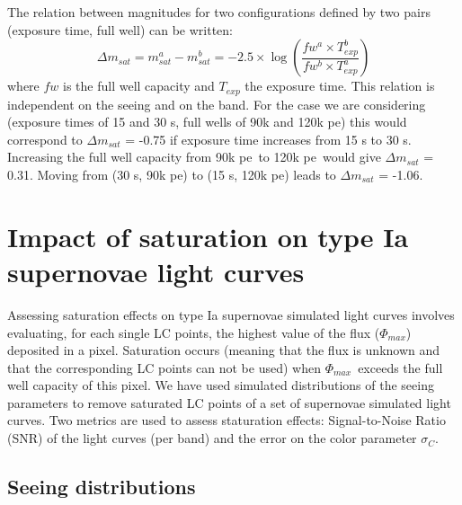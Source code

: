 \documentclass[\docopts]{\docclass}
\newcommand{\pe}{{pe}}
\newcommand{\phimax}{{$\Phi_{max}$}}
\newcommand{\colorerr}{{$\sigma_C$}}
\begin{document}
The relation between magnitudes for two configurations defined by two pairs (exposure time, full well) can be written:
\begin{equation}
\Delta m_{sat} = m^a_{sat}-m^b_{sat} = -2.5 \times \log\left(\frac{fw^a\times T_{exp}^b}{fw^b \times T_{exp}^a}\right)
 \end{equation}
where $fw$ is the full well capacity and $T_{exp}$ the exposure time. This relation is independent on the seeing and on the band. For the case we are considering (exposure times of 15 and 30 s, full wells of 90k and 120k \pe) this would correspond to  $\Delta m_{sat}$ = -0.75  if exposure time increases from 15 s to 30 s. Increasing the full well capacity from 90k \pe~to 120k \pe~would give $\Delta m_{sat}$ = 0.31. Moving from (30 s, 90k \pe) to (15 s, 120k \pe) leads to $\Delta m_{sat}$ = -1.06. 




\section{Impact of saturation on type Ia supernovae light curves}
\label{sec:sn_saturation}
Assessing saturation effects on type Ia supernovae simulated light curves involves evaluating, for each single LC points, the highest value of the flux (\phimax) deposited in a pixel. Saturation occurs (meaning that the flux is unknown and that the corresponding LC points can not be used) when \phimax~exceeds the full well capacity of this pixel. We have used simulated distributions of the seeing parameters to remove saturated LC points of a set of supernovae simulated light curves. Two metrics are used to assess staturation effects: Signal-to-Noise Ratio (SNR) of the light curves (per band) and the error on the color parameter \colorerr.

\subsection{Seeing distributions}
\end{document}
